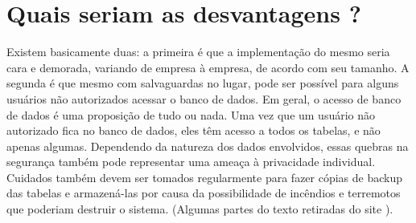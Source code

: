 \documentclass{article}
\begin{document}
\section{Quais seriam as desvantagens ?}
Existem basicamente duas: a primeira é que a implementação do mesmo seria cara e demorada, variando de empresa à empresa, de acordo com seu tamanho. A segunda é que mesmo com salvaguardas no lugar, pode ser possível para alguns usuários não autorizados acessar o banco de dados. Em geral, o acesso de banco de dados é uma proposição de tudo ou nada. Uma vez que um usuário não autorizado fica no banco de dados, eles têm acesso a todos os tabelas, e não apenas algumas. Dependendo da natureza dos dados envolvidos, essas quebras na segurança também pode representar uma ameaça à privacidade individual. Cuidados também devem ser tomados regularmente para fazer cópias de backup das tabelas e armazená-las por causa da possibilidade de incêndios e terremotos que poderiam destruir o sistema. (Algumas partes do texto retiradas do site \cite{EHGOMES}).
\end{document}
